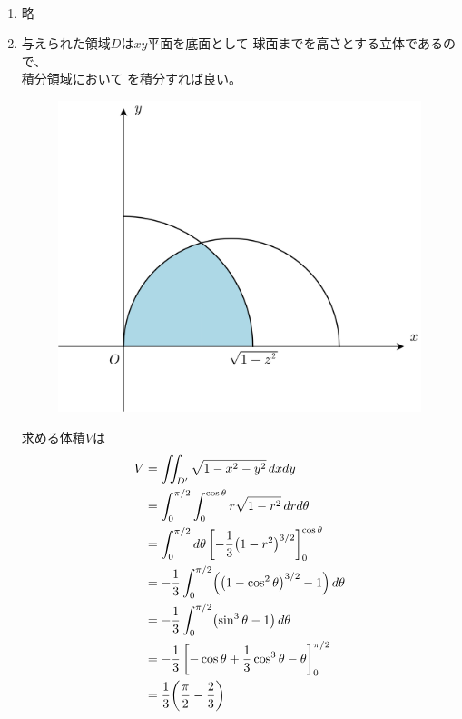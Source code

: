 \begin{ans*}
  ${}$
  \begin{enumerate}[label=(\arabic*)]
    \item 略 %
    \item 与えられた領域$D$は$xy$平面を底面として
    球面までを高さとする立体であるので、\\
    積分領域において
    を積分すれば良い。
    \begin{figure}[H]\centering
      \includegraphics[width=.5\linewidth]{./src/fig/Basic/B_2021_spring_Dprime.png}
    \end{figure}
    求める体積$V$は
    \begin{align}
      V
      &= \iint_{D'} \sqrt{1-x^2-y^2}\,dxdy \\
      &= \int_{0}^{\pi/2}\int_{0}^{\cos{\theta}} r\sqrt{1-r^2}\,drd{\theta} \\
      &= \int_{0}^{\pi/2}d{\theta} \left[-\frac{1}{3}\bigl(1-r^2\bigr)^{3/2}\right]_{0}^{\cos{\theta}} \\
      &= -\frac{1}{3}\int_{0}^{\pi/2} \Bigl(\bigl(1-\cos^2{\theta}\bigr)^{3/2} - 1\Bigr) \,d{\theta} \\
      &= -\frac{1}{3}\int_{0}^{\pi/2} \bigl( \sin^3{\theta} - 1 \bigr)\,d{\theta} \\
      &= -\frac{1}{3}\left[ -\cos{\theta} + \frac{1}{3}\cos^3{\theta} - {\theta} \right]_{0}^{\pi/2} \\
      &= \frac{1}{3}\biggl(\frac{\pi}{2} - \frac{2}{3}\biggr)
    \end{align}
  \end{enumerate}
\end{ans*}



